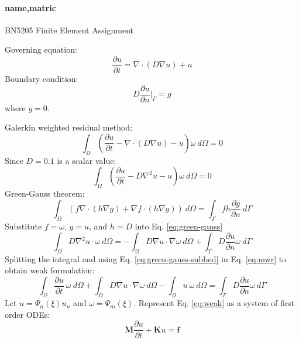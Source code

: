 \documentclass[11pt, a4paper]{article}
\newcommand{\Psim}{\ensuremath{\Psi_m(\xi)}}
\newcommand{\Psin}{\ensuremath{\Psi_n(\xi)}}
\begin{document}
  \paragraph{name,matric} BN5205 Finite Element Assignment

  Governing equation:
  \begin{equation}
  \frac{\partial u}{\partial t} = \nabla \cdot (D \nabla u) + u
  \end{equation}
  Boundary condition:
  \begin{equation}
  D \frac{\partial u}{\partial n} |_{\Gamma} = g
  \end{equation}
  where $g = 0$.
  
  Galerkin weighted residual method:
  \begin{equation*}
  \int_{\Omega} \left(\frac{\partial u}{\partial t} - \nabla \cdot (D \nabla u) 
  - u \right) \omega \: d\Omega = 0
  \end{equation*}
  Since $D = 0.1$ is a scalar value:
  \begin{equation} \label{eq:mwr}
  \int_{\Omega} \left(\frac{\partial u}{\partial t} - D \nabla^2 u - u 
  \right) \omega \: d\Omega = 0
  \end{equation}
  Green-Gauss theorem:
  \begin{equation} \label{eq:green-gauss}
  \int_{\Omega} (f \nabla \cdot (h\nabla g) + \nabla f \cdot (h \nabla g)) \: 
  d\Omega = \int_{\Gamma} f h \frac{\partial g}{\partial n} \: d\Gamma
  \end{equation}
  Substitute $f = \omega$, $g = u$, and $h = D$ into Eq. \eqref{eq:green-gauss}
  \begin{equation} \label{eq:green-gauss-subbed}
  \int_{\Omega} D\nabla^2 u \cdot \omega \: d\Omega = -\int_{\Omega} D\nabla 
  u \cdot \nabla \omega \: d\Omega + \int_{\Gamma} D \frac{\partial 
  u}{\partial n} \omega \: d\Gamma
  \end{equation}
  Splitting the integral and using Eq. \eqref{eq:green-gauss-subbed} in Eq. 
  \eqref{eq:mwr} to obtain weak formulation:
  \begin{equation} \label{eq:weak}
  \int_{\Omega} \frac{\partial u}{\partial t} \: \omega \: d\Omega + 
  \int_{\Omega} D\nabla u \cdot \nabla \omega \: d\Omega - \int_{\Omega} u \: 
  \omega \: d\Omega = \int_{\Gamma} D \frac{\partial u}{\partial n} \omega \: 
  d\Gamma
  \end{equation}
  Let $u = \Psin u_n$ and $\omega = \Psim$. Represent Eq. 
  \eqref{eq:weak} as a system of first order ODEs:
  \begin{equation}
  \mathbf{M} \frac{\partial u}{\partial t} + \mathbf{K}u = \mathbf{f}
  \end{equation}
\end{document}

